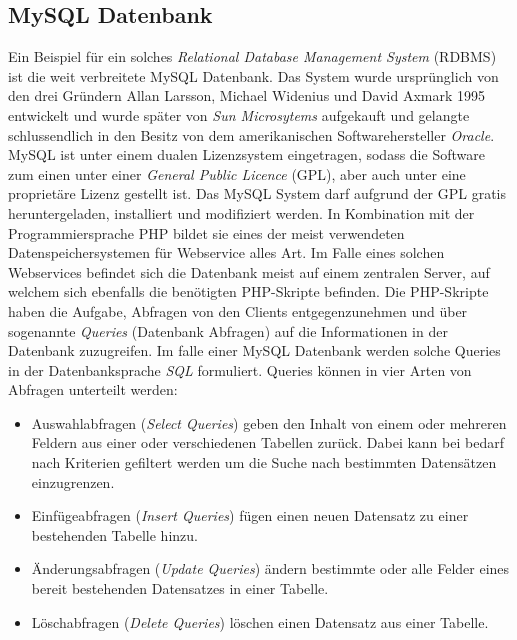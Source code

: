 \documentclass[a4paper,11pt]{report}
\begin{document}
				\subsection{MySQL Datenbank}
				Ein Beispiel für ein solches \emph{Relational Database Management System} (RDBMS) ist die weit verbreitete MySQL Datenbank. Das System wurde ursprünglich von den drei Gründern Allan Larsson, Michael Widenius und David Axmark 1995 entwickelt und wurde später von \emph{Sun Microsytems} aufgekauft und gelangte schlussendlich in den Besitz von dem amerikanischen Softwarehersteller \emph{Oracle}. MySQL ist unter einem dualen Lizenzsystem eingetragen, sodass die Software zum einen unter einer \emph{General Public Licence} (GPL), aber auch unter eine proprietäre Lizenz gestellt ist. \cite{tecmint.com} Das MySQL System darf aufgrund der GPL gratis heruntergeladen, installiert und modifiziert werden. In Kombination mit der Programmiersprache PHP bildet sie eines der meist verwendeten Datenspeichersystemen für Webservice alles Art. Im Falle eines solchen Webservices befindet sich die Datenbank meist auf einem zentralen Server, auf welchem sich ebenfalls die benötigten PHP-Skripte befinden. Die PHP-Skripte haben die Aufgabe, Abfragen von den Clients entgegenzunehmen und über sogenannte \emph{Queries} (Datenbank Abfragen) auf die Informationen in der Datenbank zuzugreifen. Im falle einer MySQL Datenbank werden solche Queries in der Datenbanksprache \emph{SQL} formuliert. Queries können in vier Arten von Abfragen unterteilt werden: \cite[S. 760]{IT-Handbuch}
				
				\begin{itemize}
					\item Auswahlabfragen (\emph{Select Queries}) geben den Inhalt von einem oder mehreren Feldern aus einer oder verschiedenen Tabellen zurück. Dabei kann bei bedarf nach Kriterien gefiltert werden um die Suche nach bestimmten Datensätzen einzugrenzen.\cite[S. 746]{IT-Handbuch}
					\item Einfügeabfragen (\emph{Insert Queries}) fügen einen neuen Datensatz zu einer bestehenden Tabelle hinzu.\cite[S. 746]{IT-Handbuch}
					\item Änderungsabfragen (\emph{Update Queries}) ändern bestimmte oder alle Felder eines bereit bestehenden Datensatzes in einer Tabelle.\cite[S. 746]{IT-Handbuch}
					\item Löschabfragen (\emph{Delete Queries}) löschen einen Datensatz aus einer Tabelle. \cite[S. 746]{IT-Handbuch}
				\end{itemize}
				
\end{document}
